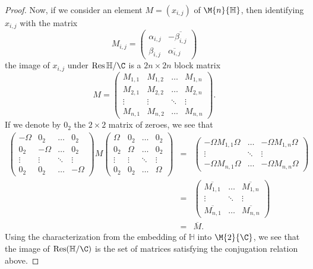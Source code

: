\documentclass[10pt]{amsart}
\begin{document}
\begin{ex}
\begin{proof}
    Now, if we consider an element $M = \left(x_{i,j}\right)$ of $\M{n}{\mathbb{H}}$, then identifying $x_{i,j}$ with the matrix
    $$M_{i,j} = \left(\begin{matrix}
      \alpha_{i,j} & -\overline{\beta_{i,j}}\\
      \beta_{i,j} & \overline{\alpha_{i,j}}
    \end{matrix}\right)$$
    the image of $x_{i,j}$ under $\operatorname{Res}{\mathbb{H}/\C}$ is a $2n \times 2n$ block matrix
    $$M = \left(\begin{matrix}
      M_{1,1} & M_{1,2} & \ldots & M_{1,n}\\
      M_{2,1} & M_{2,2} & \ldots & M_{2,n}\\
      \vdots & \vdots & \ddots & \vdots\\
      M_{n,1} & M_{n,2} & \ldots & M_{n,n}
    \end{matrix}\right).$$
    If we denote by $0_2$ the $2 \times 2$ matrix of zeroes, we see that
    \begin{eqnarray*}
      \left(\begin{matrix}
      -\Omega &  0_2 & \ldots & 0_2\\
      0_2 & -\Omega & \ldots & 0_2\\
      \vdots & \vdots & \ddots & \vdots\\
      0_2 & 0_2 & \ldots & -\Omega
    \end{matrix}\right)
    M
    \left(\begin{matrix}
      \Omega &  0_2 & \ldots & 0_2\\
      0_2 & \Omega & \ldots & 0_2\\
      \vdots & \vdots & \ddots & \vdots\\
      0_2 & 0_2 & \ldots & \Omega
    \end{matrix}\right)
    &=&
    \left(\begin{matrix}
        -\Omega M_{1,1}\Omega & \ldots & -\Omega M_{1,n}\Omega\\
        \vdots & \ddots & \vdots\\
        -\Omega M_{n,1} \Omega & \ldots & -\Omega M_{n,n} \Omega
      \end{matrix}\right)\\
    &=& 
    \left(\begin{matrix}
      \overline{M_{1,1}} & \ldots & \overline{M_{1,n}}\\
        \vdots & \ddots & \vdots\\
        \overline{M_{n,1}} & \ldots & \overline{M_{n,n}}
      \end{matrix}\right)\\
    &=& \overline{M}.
    \end{eqnarray*}
    Using the characterization from the embedding of $\mathbb{H}$ into $\M{2}{\C}$, we see that the image of $\operatorname{Res}(\mathbb{H}/\C)$ is the set of matrices satisfying the conjugation relation above.
  \end{proof}
\end{ex}
\end{document}
